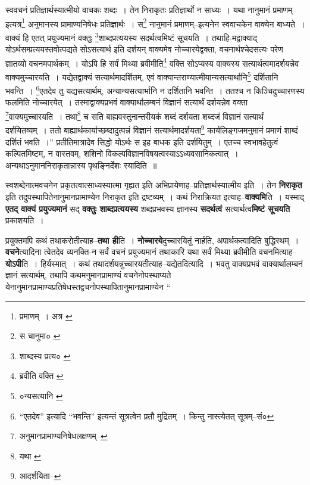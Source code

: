 \documentclass[article,12pt,a4paper]{memoir}
\begin{document}
	स्ववचनं प्रतिज्ञार्थस्यात्मीयो वाचकः शब्दः । तेन निराकृतः प्रतिज्ञार्थो न साध्यः । यथा नानुमानं प्रमाणम्--इत्यत्र\footnote{प्रमाणम् । अत्र \cite{dp-msA} \cite{dp-msB} \cite{dp-msD} \cite{dp-edP} \cite{dp-edH} \cite{dp-edE} \cite{dp-edN}} अनुमानस्य प्रामाण्यनिषेधः प्रतिज्ञार्थः । स\footnote{स चानुमा० \cite{dp-msC}} नानुमानं प्रमाणम्--इत्यनेन स्ववाचकेन वाक्येन बाध्यते । वाक्यं हि एतत् प्रयुज्यमानं वक्तुः \footnote{शाब्दस्य प्रत्य० \cite{dp-msA} \cite{dp-msB} \cite{dp-msC} \cite{dp-msD} \cite{dp-edP} \cite{dp-edH} \cite{dp-edE} \cite{dp-edN}}शाब्दप्रत्ययस्य सदर्थत्वमिष्टं सूचयति । तथाहि-मद्वाक्याद् योऽर्थसम्प्रत्ययस्तवोत्पद्यते सोऽसत्यार्थ इति दर्शयन् वाक्यमेव नोच्चारयेद्वक्ता, वचनार्थश्चेदसत्यः परेण ज्ञातव्यो वचनमपार्थकम् । योऽपि हि सर्वं मिथ्या ब्रवीमीति\footnote{ब्रवीति वक्ति \cite{dp-msB}} वक्ति सोऽप्यस्य वाक्यस्य सत्यार्थत्वमादर्शयन्नेव वाक्यमुच्चारयति । यद्येतद्वाक्यं सत्यार्थमादर्शितम्, एवं वाक्यान्तराण्यात्मीयान्यसत्यार्थानि\footnote{०न्यसत्यानि \cite{dp-msA}} दर्शितानि भवन्ति । \footnote{“एतदेव” इत्यादि “भवन्ति” इत्यन्तं सूत्रत्वेन \cite{dp-edH} प्रतौ मुद्रितम् । किन्तु नास्त्येतत् सूत्रम्--सं०}एतदेव तु यद्यसत्यार्थम्, अन्यान्यसत्यार्भानि न दर्शितानि भवन्ति । ततश्च न किञ्चिदुच्चारणस्य फलमिति नोच्चारयेत् । तस्माद्वाक्यप्रभवं वाक्यार्थालम्बनं विज्ञानं सत्यार्थं दर्शयन्नेव वक्ता \footnote{अनुमानप्रामाण्यनिषेधलक्षणम्--\cite{dp-msD-n}}वाक्यमुच्चारयति । तथा\footnote{यथा \cite{dp-msA}} च सति बाह्यवस्तुनान्तरीयकं शब्दं दर्शयता शब्दजं विज्ञानं सत्यार्थं दर्शयितव्यम् । ततो बाह्यार्थकार्याच्छब्दादुत्पन्नं विज्ञानं सत्यार्थमादर्शयता\footnote{आदर्शयिता--\cite{dp-msA}} कार्यलिङ्गजमनुमानं प्रमाणं शाब्दं दर्शितं भवति ।” प्रतीतिमात्रादेव सिद्धो योऽर्थः स इह बाधक इति दर्शयितुम् । एतच्च स्वभावहेतुत्वं कल्पितमिष्टम्, न वास्तवम्, शशिनो विकल्पविज्ञानविषयत्वस्याऽऽध्यवसानिकत्वात् । अन्यथाऽनुमाननिराकृतान्नास्य पृथङ्निर्देशः स्यादिति ॥
	\pend
      

	  \pstart स्वशब्देनात्मवचनेन प्रकृतत्वात्साध्यस्यात्मा गृह्यत इति अभिप्रायेणाह--प्रतिज्ञार्थस्यात्मीय इति । तेन \textbf{निराकृत} इति तदुपस्थापितेनानुमानप्रामाण्येन निराकृत इति द्रष्टव्यम् । कथं निराक्रियत इत्याह--\textbf{वाक्यमि}ति । यस्माद् \textbf{एतद् वाक्यं प्रयुज्यमानं} सद् \textbf{वक्तुः शाब्दप्रत्ययस्य} शब्दप्रभवस्य ज्ञानस्य \textbf{सदर्थत्वं} सत्यार्थत्व\textbf{मिष्टं सूचयति} प्रकाशयति ।
	\pend
      

	  \pstart प्रयुक्तमपि कथं तथाकरोतीत्याह--\textbf{तथा ही}ति । \textbf{नोच्चारये}दुच्चारयितुं नार्हति, अपार्थकत्वादिति बुद्धिस्थम् । \textbf{वचने}त्यादिना त्वेतदेव व्यनक्ति-न सर्वं वचनं प्रयुज्यमानं तथाकारि यथा सर्वं मिथ्या ब्रवीमीति वचनमित्याह--\textbf{योऽपी}ति । हिर्यस्मात् । कथं तथादर्शयन्नुच्चारयतीत्याह--यद्येतदित्यादि । भवतु वाक्यप्रभवं वाक्यार्थालम्बनं ज्ञानं सत्यार्थम्, तथापि कथमनुमानप्रामाण्यं वचनेनोपस्थाप्यते येनानुमानप्रामाण्यप्रतिषेधस्तद्वचनोपस्थापितानुमानप्रामाण्येन  \leavevmode{} “
	  
\end{document}
